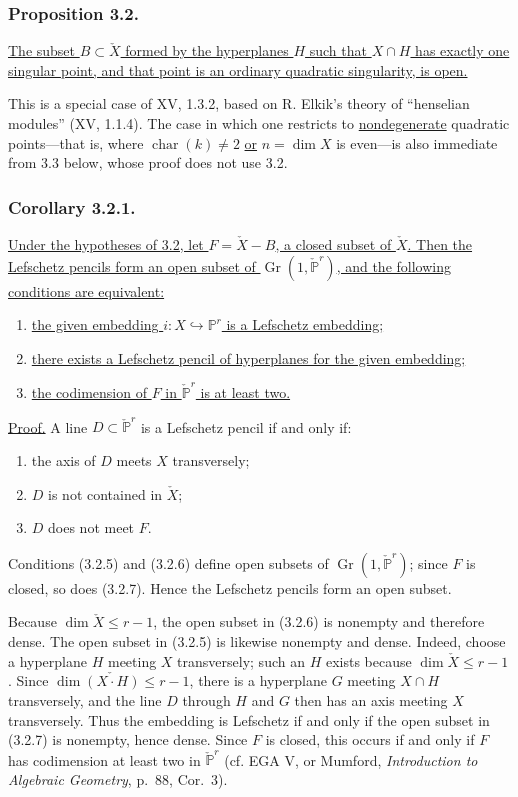 \subsubsection*{Proposition 3.2.}
\underline{The subset $B\subset\check X$ formed by the hyperplanes
$H$ such that $X\cap H$ has exactly one singular point, and that point
is an ordinary quadratic singularity, is open.}

This is a special case of XV, 1.3.2, based on R. Elkik's theory of
``henselian modules'' (XV, 1.1.4).  The case in which one restricts to
\underline{nondegenerate} quadratic points---that is, where
$\operatorname{char}(k)\ne2$ \underline{or} $n=\dim X$ is even---is
also immediate from 3.3 below, whose proof does not use 3.2.

\subsubsection*{Corollary 3.2.1.}
\underline{Under the hypotheses of 3.2, let $F=\check X-B$, a closed
subset of $\check X$.  Then the Lefschetz pencils form an open subset
of $\operatorname{Gr}(1,\check{\mathbb P}^{r})$, and the following
conditions are equivalent:}
\begin{enumerate}
\item[3.2.2.] \underline{the given embedding
$i:X\hookrightarrow\mathbb P^r$ is a Lefschetz embedding;}
\item[3.2.3.] \underline{there exists a Lefschetz pencil of
hyperplanes for the given embedding;}
\item[3.2.4.] \underline{the codimension of $F$ in
$\check{\mathbb P}^{r}$ is at least two.}
\end{enumerate}

\noindent\underline{Proof.}
A line $D\subset\check{\mathbb P}^{r}$ is a Lefschetz pencil if and
only if:
\begin{enumerate}
\item[(3.2.5)] the axis of $D$ meets $X$ transversely;
\item[(3.2.6)] $D$ is not contained in $\check X$;
\item[(3.2.7)] $D$ does not meet $F$.
\end{enumerate}
Conditions (3.2.5) and (3.2.6) define open subsets of
$\operatorname{Gr}(1,\check{\mathbb P}^{r})$; since $F$ is closed, so
does (3.2.7).  Hence the Lefschetz pencils form an open subset.

Because $\dim\check X\leq r-1$, the open subset in (3.2.6) is nonempty and
therefore dense.  The open subset in (3.2.5) is likewise nonempty and
dense.  Indeed, choose a hyperplane $H$ meeting $X$ transversely; such
an $H$ exists because $\dim\check X\leq r-1$.  Since
$\dim\check{(X\mathbin{\cdot}H)}\leq r-1$, there is a hyperplane $G$ meeting
$X\cap H$ transversely, and the line $D$ through $H$ and $G$ then has
an axis meeting $X$ transversely.  Thus the embedding is Lefschetz if
and only if the open subset in (3.2.7) is nonempty, hence dense.  Since
$F$ is closed, this occurs if and only if $F$ has codimension at least
two in $\check{\mathbb P}^{r}$ (cf. EGA V, or Mumford,
\emph{Introduction to Algebraic Geometry}, p.~88, Cor.~3).

